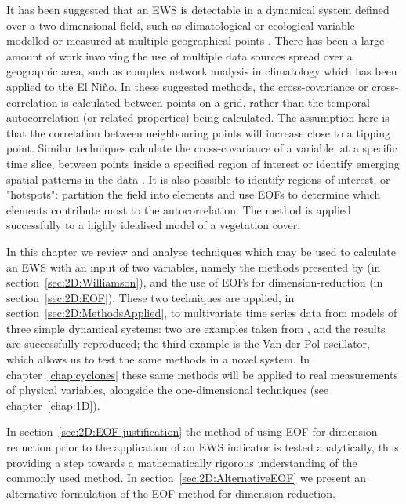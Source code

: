   		It has been suggested that an EWS is detectable in a dynamical system defined over a two-dimensional field, such as climatological or ecological variable modelled or measured at multiple geographical points \citep{guttal2009spatial, donangelo2010early, dakos2010spatial}. There has been a large amount of work involving the use of multiple data sources spread over a geographic area, such as complex network analysis in climatology \citep{tsonis2006,yamasaki2008,gozolchiani2011} which has been applied to the El Ni{\~n}o. In these suggested methods, the cross-covariance or cross-correlation is calculated between points on a grid, rather than the temporal autocorrelation (or related properties) being calculated. The assumption here is that the correlation between neighbouring points will increase close to a tipping point. Similar techniques calculate the cross-covariance of a variable, at a specific time slice, between points inside a specified region of interest \citep{ludescher2013,ludescher2014} or identify emerging spatial patterns in the data \citep{kefi2014early}. It is also possible to identify regions of interest, or "hotspots": \citet{bathiany2013p1} partition the field into elements and use EOFs to determine which elements contribute most to the autocorrelation. The method is applied successfully to a highly idealised model of a vegetation cover.
    	
    	In this chapter we review and analyse techniques which may be used to calculate an EWS with an input of two variables, namely the methods presented by \citet{williamson2015} (in section~\ref{sec:2D:Williamson}), and the use of EOFs for dimension-reduction (in section~\ref{sec:2D:EOF}). These two techniques are applied, in section~\ref{sec:2D:MethodsApplied}, to multivariate time series data from models of three simple dynamical systems: two are examples taken from \citet{williamson2015}, and the results are successfully reproduced; the third example is the Van der Pol oscillator, which allows us to test the same methods in a novel system. In chapter~\ref{chap:cyclones} these same methods will be applied to real measurements of physical variables, alongside the one-dimensional techniques (see chapter~\ref{chap:1D}). 
    	
    	In section~\ref{sec:2D:EOF-justification} the method of using EOF for dimension reduction prior to the application of an EWS indicator is tested analytically, thus providing a step towards a mathematically rigorous understanding of the commonly used method. In section~\ref{sec:2D:AlternativeEOF} we present an alternative formulation of the EOF method for dimension reduction. 
  	
